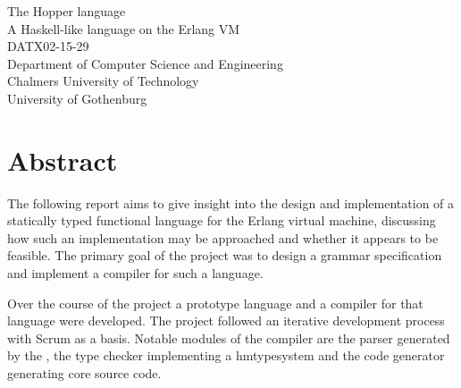The Hopper language\\
A Haskell-like language on the Erlang VM\\
DATX02-15-29\\
Department of Computer Science and Engineering\\
Chalmers University of Technology\\
University of Gothenburg\\

\thispagestyle{plain}			%

\setlength{\parindent}{15pt}

\section*{Abstract}





The following report aims to give insight into the design and implementation of a statically typed functional language for the Erlang virtual machine, discussing how such an implementation may be approached and whether it appears to be feasible. The primary goal of the project was to design a grammar specification and implement a compiler for such a language.


Over the course of the project a prototype language and a compiler for that language were developed. The project followed an iterative development process with Scrum as a basis. Notable modules of the compiler are the parser generated by the , the type checker implementing a \gls{hmtypesystem} and the code generator generating \gls{core} source code.


